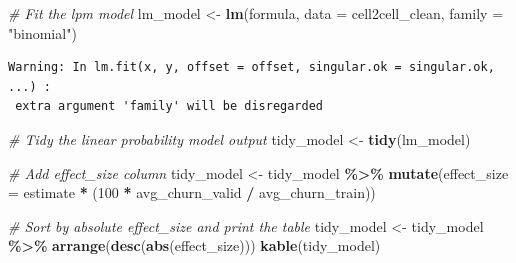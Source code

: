 \documentclass[
]{article}
\newenvironment{Shaded}{\begin{snugshade}}{\end{snugshade}}
\newcommand{\AttributeTok}[1]{\textcolor[rgb]{0.13,0.29,0.53}{#1}}
\newcommand{\CommentTok}[1]{\textcolor[rgb]{0.56,0.35,0.01}{\textit{#1}}}
\newcommand{\DecValTok}[1]{\textcolor[rgb]{0.00,0.00,0.81}{#1}}
\newcommand{\FunctionTok}[1]{\textcolor[rgb]{0.13,0.29,0.53}{\textbf{#1}}}
\newcommand{\NormalTok}[1]{#1}
\newcommand{\OtherTok}[1]{\textcolor[rgb]{0.56,0.35,0.01}{#1}}
\newcommand{\SpecialCharTok}[1]{\textcolor[rgb]{0.81,0.36,0.00}{\textbf{#1}}}
\newcommand{\StringTok}[1]{\textcolor[rgb]{0.31,0.60,0.02}{#1}}
\begin{document}
\begin{Shaded}
\begin{Highlighting}[]
\CommentTok{\# Fit the lpm model}
\NormalTok{lm\_model }\OtherTok{\textless{}{-}} \FunctionTok{lm}\NormalTok{(formula, }\AttributeTok{data =}\NormalTok{ cell2cell\_clean, }\AttributeTok{family =} \StringTok{"binomial"}\NormalTok{)}
\end{Highlighting}
\end{Shaded}

\begin{verbatim}
Warning: In lm.fit(x, y, offset = offset, singular.ok = singular.ok, ...) :
 extra argument 'family' will be disregarded
\end{verbatim}

\begin{Shaded}
\begin{Highlighting}[]
\CommentTok{\# Tidy the linear probability model output}
\NormalTok{tidy\_model }\OtherTok{\textless{}{-}} \FunctionTok{tidy}\NormalTok{(lm\_model)}

\CommentTok{\# Add effect\_size column}
\NormalTok{tidy\_model }\OtherTok{\textless{}{-}}\NormalTok{ tidy\_model }\SpecialCharTok{\%\textgreater{}\%}
  \FunctionTok{mutate}\NormalTok{(}\AttributeTok{effect\_size =}\NormalTok{ estimate }\SpecialCharTok{*}\NormalTok{ (}\DecValTok{100} \SpecialCharTok{*}\NormalTok{ avg\_churn\_valid }\SpecialCharTok{/}\NormalTok{ avg\_churn\_train))}

\CommentTok{\# Sort by absolute effect\_size and print the table}
\NormalTok{tidy\_model }\OtherTok{\textless{}{-}}\NormalTok{ tidy\_model }\SpecialCharTok{\%\textgreater{}\%} \FunctionTok{arrange}\NormalTok{(}\FunctionTok{desc}\NormalTok{(}\FunctionTok{abs}\NormalTok{(effect\_size)))}
\FunctionTok{kable}\NormalTok{(tidy\_model)}
\end{Highlighting}
\end{Shaded}
\end{document}
